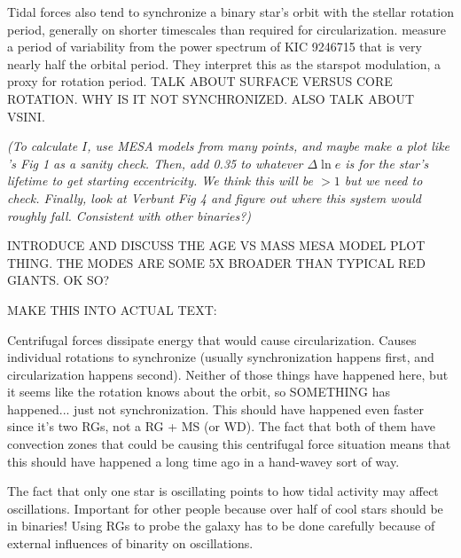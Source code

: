Tidal forces also tend to synchronize a binary star's orbit with the stellar rotation period, generally on shorter timescales than required for circularization. \citet{gau14} measure a period of variability from the power spectrum of KIC 9246715 that is very nearly half the orbital period. They interpret this as the starspot modulation, a proxy for rotation period. TALK ABOUT SURFACE VERSUS CORE ROTATION. WHY IS IT NOT SYNCHRONIZED. ALSO TALK ABOUT VSINI.

\textit{(To calculate $I$, use MESA models from many points, and maybe make a plot like \citet{ver95}'s Fig 1 as a sanity check. Then, add 0.35 to whatever $\Delta \ln e$ is for the star's lifetime to get starting eccentricity. We think this will be $>1$ but we need to check. Finally, look at Verbunt Fig 4 and figure out where this system would roughly fall. Consistent with other binaries?)}

INTRODUCE AND DISCUSS THE AGE VS MASS MESA MODEL PLOT THING.
THE MODES ARE SOME 5X BROADER THAN TYPICAL RED GIANTS. OK SO?

MAKE THIS INTO ACTUAL TEXT:

Centrifugal forces dissipate energy that would cause circularization. Causes individual rotations to synchronize (usually synchronization happens first, and circularization happens second). Neither of those things have happened here, but it seems like the rotation knows about the orbit, so SOMETHING has happened... just not synchronization. This should have happened even faster since it's two RGs, not a RG + MS (or WD). The fact that both of them have convection zones that could be causing this centrifugal force situation means that this should have happened a long time ago in a hand-wavey sort of way.

The fact that only one star is oscillating points to how tidal activity may affect oscillations.
Important for other people because over half of cool stars should be in binaries! Using RGs to probe the galaxy has to be done carefully because of external influences of binarity on oscillations.

